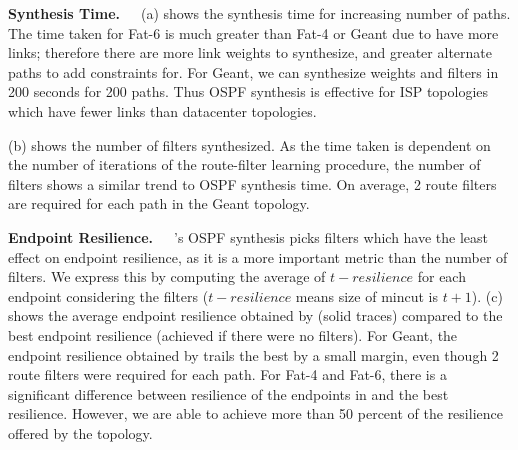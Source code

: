 \noindent\textbf{Synthesis Time.}~~~(a) 
shows the synthesis time for increasing number of paths. 
The time taken for Fat-6 is much greater than Fat-4 or Geant
due to have more links; therefore there are more link weights
to synthesize, and greater alternate paths to add constraints for. 
For Geant, we can synthesize weights and filters in 200 seconds 
for 200 paths. Thus OSPF synthesis is effective for ISP topologies
which have fewer links than datacenter topologies.

(b) shows the number of filters synthesized. 
As the time taken is dependent on the number of iterations of
the route-filter learning procedure, the number of filters
shows a similar trend to OSPF synthesis time. On average, 2 route filters
are required for each path in the Geant topology. 

\noindent\textbf{Endpoint Resilience.}~~~\name's OSPF synthesis picks
filters which have the least effect on endpoint resilience, as it  
is a more important metric than the number of filters. We express this
by computing the average of $t-resilience$ for each endpoint considering
the filters ($t-resilience$ means size of mincut is $t+1$).
(c) shows the average
endpoint resilience obtained by \name (solid traces) 
compared to the best endpoint resilience (achieved
if there were no filters). For Geant, the endpoint 
resilience obtained by \name trails the best by a small margin,
even though 2 route filters were required for each path. For
Fat-4 and Fat-6, there is a significant difference between resilience
of the endpoints in \name and the best resilience. 
However, we are able to achieve more than
50 percent of the resilience offered by the topology. 

